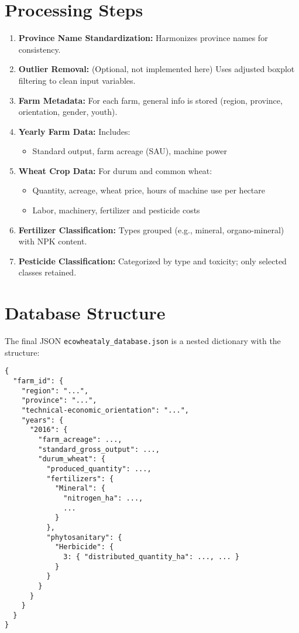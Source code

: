 \documentclass[11pt,a4paper]{article}
\begin{document}
\section*{Processing Steps}
\begin{enumerate}
    \item \textbf{Province Name Standardization:} Harmonizes province names for consistency.
    \item \textbf{Outlier Removal:} (Optional, not implemented here) Uses adjusted boxplot filtering to clean input variables.
    \item \textbf{Farm Metadata:} For each farm, general info is stored (region, province, orientation, gender, youth).
    \item \textbf{Yearly Farm Data:} Includes:
    \begin{itemize}
        \item Standard output, farm acreage (SAU), machine power
    \end{itemize}
    \item \textbf{Wheat Crop Data:} For durum and common wheat:
    \begin{itemize}
        \item Quantity, acreage, wheat price, hours of machine use per hectare
        \item Labor, machinery, fertilizer and pesticide costs
    \end{itemize}
    \item \textbf{Fertilizer Classification:} Types grouped (e.g., mineral, organo-mineral) with NPK content.
    \item \textbf{Pesticide Classification:} Categorized by type and toxicity; only selected classes retained.
\end{enumerate}

\section*{Database Structure}
The final JSON \texttt{ecowheataly\_database.json} is a nested dictionary with the structure:

\begin{verbatim}
{
  "farm_id": {
    "region": "...",
    "province": "...",
    "technical-economic_orientation": "...",
    "years": {
      "2016": {
        "farm_acreage": ...,
        "standard_gross_output": ...,
        "durum_wheat": {
          "produced_quantity": ...,
          "fertilizers": {
            "Mineral": {
              "nitrogen_ha": ...,
              ...
            }
          },
          "phytosanitary": {
            "Herbicide": {
              3: { "distributed_quantity_ha": ..., ... }
            }
          }
        }
      }
    }
  }
}
\end{verbatim}
\end{document}
